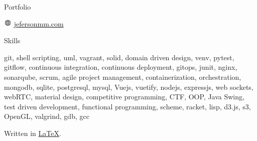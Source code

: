 \documentclass{cv} %
\def\iconsize{0.4cm}
\begin{document}
\begin{minipage}[b][0.9\paperheight][t]{0.29\linewidth}
\begin{rSection}{Portfolio}
    \item[]\includegraphics[width=\iconsize, trim={0cm 0.12cm 0.03cm 0cm}]{website.png}
        \href{http://jefersonmm.com}{jefersonmm.com}
\end{rSection}

\tiny 
\begin{rSection}{Skills}
    \item[] git, shell scripting, uml, vagrant, solid, domain driven design,
    venv, pytest, gitflow, continuous integration, continuous deployment,
    gitops, junit, nginx, sonarqube, scrum, agile project management, containerization,
    orchestration, 
    mongodb, sqlite, postgresql, mysql, %
    Vuejs, vuetify, nodejs, expressjs, web sockets, webRTC, material design, %
    competitive programming, CTF, OOP, Java Swing, test driven development,
    functional programming, scheme, racket, lisp, d3.js, s3, OpenGL, valgrind, gdb, gcc
\end{rSection}
\normalsize
{}

\vspace{4.6cm}
Written in \href{https://github.com/JekxDevil/curriculum-vitae}{\LaTeX}.

\end{minipage}
\hspace{0.1cm}
\end{document}
